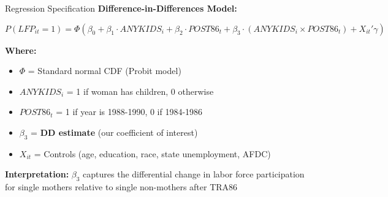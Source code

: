 \documentclass[aspectratio=169]{beamer}
\begin{document}
\begin{frame}{Regression Specification}
\textbf{Difference-in-Differences Model:}

\vspace{0.3cm}
\begin{equation*}
P(LFP_{it} = 1) = \Phi(\beta_0 + \beta_1 \cdot ANYKIDS_i + \beta_2 \cdot POST86_t + \beta_3 \cdot (ANYKIDS_i \times POST86_t) + X_{it}'\gamma)
\end{equation*}

\vspace{0.5cm}
\textbf{Where:}
\begin{itemize}
    \item $\Phi$ = Standard normal CDF (Probit model)
    \item $ANYKIDS_i$ = 1 if woman has children, 0 otherwise
    \item $POST86_t$ = 1 if year is 1988-1990, 0 if 1984-1986
    \item $\beta_3$ = \textbf{DD estimate} (our coefficient of interest)
    \item $X_{it}$ = Controls (age, education, race, state unemployment, AFDC)
\end{itemize}

\vspace{0.3cm}
\textbf{Interpretation:} $\beta_3$ captures the differential change in labor force participation for single mothers relative to single non-mothers after TRA86
\end{frame}
\end{document}
